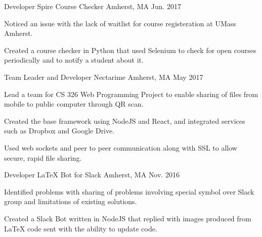 

\begin{cventries}

  \cventry
    {Developer} %
    {Spire Course Checker} %
    {Amherst, MA} %
    {Jun. 2017} %
    {
      \begin{cvitems} %
      	\item Noticed an issue with the lack of waitlist for course registeration at UMass Amherst.
        \item Created a course checker in Python that used Selenium to check for open courses periodically and to notify a student about it.
      \end{cvitems}
    }

  \cventry
    {Team Leader and Developer} %
    {Nectarime} %
    {Amherst, MA} %
    {May 2017} %
    {
      \begin{cvitems} %
        \item Lead a team for CS 326 Web Programming Project to enable sharing of files from mobile to public computer through QR scan.
        \item Created the base framework using NodeJS and React, and integrated services such as Dropbox and Google Drive.
        \item Used web sockets and peer to peer communication along with SSL to allow secure, rapid file sharing.
      \end{cvitems}
    }

  \cventry
    {Developer} %
    {{\selectfont \LaTeX } Bot for Slack} %
    {Amherst, MA} %
    {Nov. 2016} %
    {
      \begin{cvitems} %
        \item Identified problems with sharing of problems involving special symbol over Slack group and limitations of existing solutions.
        \item Created a Slack Bot written in NodeJS that replied with images produced from {\selectfont \LaTeX } code sent with the ability to update code.
      \end{cvitems}
    }


\end{cventries}
